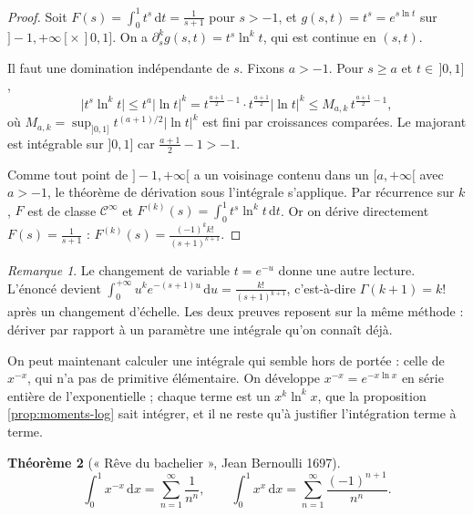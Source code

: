 \documentclass[11pt,a4paper]{article}
\theoremstyle{plain}
\newtheorem{theoreme}{Théorème}[section]
\theoremstyle{definition}
\theoremstyle{remark}
\newtheorem{remarque}[theoreme]{Remarque}
\newcommand{\dd}{\,\mathrm{d}}
\begin{document}
\begin{proof}
Soit $F(s)=\int_0^1t^s\dd t=\frac1{s+1}$ pour $s>-1$, et $g(s,t)=t^s=e^{s\ln t}$ sur $]-1,+\infty[\times\,]0,1]$. On a $\partial_s^kg(s,t)=t^s\ln^kt$, qui est continue en $(s,t)$.

Il faut une domination indépendante de $s$. Fixons $a>-1$. Pour $s\geq a$ et $t\in\,]0,1]$,
\[
  \big|t^s\ln^kt\big|\leq t^a|\ln t|^k=t^{\frac{a+1}2-1}\cdot t^{\frac{a+1}2}|\ln t|^k\leq M_{a,k}\,t^{\frac{a+1}2-1},
\]
où $M_{a,k}=\sup_{]0,1]}t^{(a+1)/2}|\ln t|^k$ est fini par croissances comparées. Le majorant est intégrable sur $]0,1]$ car $\frac{a+1}2-1>-1$.

Comme tout point de $]-1,+\infty[$ a un voisinage contenu dans un $[a,+\infty[$ avec $a>-1$, le théorème de dérivation sous l'intégrale s'applique. Par récurrence sur $k$, $F$ est de classe $\mathcal C^\infty$ et $F^{(k)}(s)=\int_0^1t^s\ln^kt\dd t$. Or on dérive directement $F(s)=\frac1{s+1}$ : $F^{(k)}(s)=\frac{(-1)^kk!}{(s+1)^{k+1}}$.
\end{proof}

\begin{remarque}
Le changement de variable $t=e^{-u}$ donne une autre lecture. L'énoncé devient $\int_0^{+\infty}u^ke^{-(s+1)u}\dd u=\frac{k!}{(s+1)^{k+1}}$, c'est-à-dire $\Gamma(k+1)=k!$ après un changement d'échelle. Les deux preuves reposent sur la même méthode : dériver par rapport à un paramètre une intégrale qu'on connaît déjà.
\end{remarque}

On peut maintenant calculer une intégrale qui semble hors de portée : celle de $x^{-x}$, qui n'a pas de primitive élémentaire. On développe $x^{-x}=e^{-x\ln x}$ en série entière de l'exponentielle ; chaque terme est un $x^k\ln^kx$, que la proposition \ref{prop:moments-log} sait intégrer, et il ne reste qu'à justifier l'intégration terme à terme.

\begin{theoreme}[« Rêve du bachelier », Jean Bernoulli 1697]\label{thm:sophomore}
\[
  \int_0^1x^{-x}\dd x=\sum_{n=1}^{\infty}\frac{1}{n^n},\qquad
  \int_0^1x^{x}\dd x=\sum_{n=1}^{\infty}\frac{(-1)^{n+1}}{n^n}.
\]
\end{theoreme}
\end{document}
